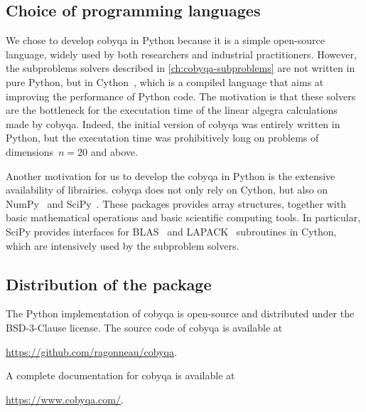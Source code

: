 \subsection{Choice of programming languages}

We chose to develop \gls{cobyqa} in Python because it is a simple open-source language, widely used by both researchers and industrial practitioners.
However, the subproblems solvers described in \cref{ch:cobyqa-subproblems} are not written in pure Python, but in Cython~\cite{Behnel_Etal_2011}, which is a compiled language that aims at improving the performance of Python code.
The motivation is that these solvers are the bottleneck for the executation time of the linear algegra calculations made by \gls{cobyqa}.
Indeed, the initial version of \gls{cobyqa} was entirely written in Python, but the executation time was prohibitively long on problems of dimensions~$n = 20$ and above.

Another motivation for us to develop the \gls{cobyqa} in Python is the extensive availability of librairies.
\Gls{cobyqa} does not only rely on Cython, but also on NumPy~\cite{Harris_Etal_2020} and SciPy~\cite{Virtanen_Etal_2020}.
These packages provides array structures, together with basic mathematical operations and basic scientific computing tools.
In particular, SciPy provides interfaces for BLAS~\cite{Blackford_Etal_2002} and LAPACK~\cite{Anderson_Etal_1999} subroutines in Cython, which are intensively used by the subproblem solvers.

\subsection{Distribution of the package}

The Python implementation of \gls{cobyqa} is open-source and distributed under the BSD-3-Clause license.
The source code of \gls{cobyqa} is available at
\begin{center}
    \url{https://github.com/ragonneau/cobyqa}.
\end{center}
A complete documentation for \gls{cobyqa} is available at
\begin{center}
    \url{https://www.cobyqa.com/}.
\end{center}

